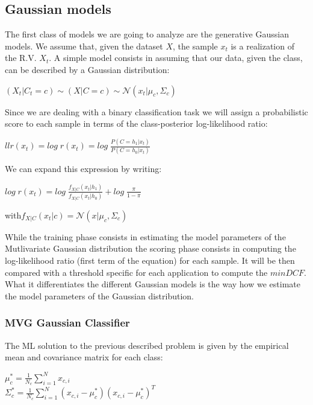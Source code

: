 \documentclass[10pt, a4paper, twocolumn]{article} %
\begin{document}
\subsection{Gaussian models}
The first class of models we are going to analyze are the generative Gaussian models. We assume that,
given the dataset $X$, the sample $x_{t}$ is a realization of the R.V. $X_{t}$. A simple
model consists in assuming that our data, given the class, can be described by a Gaussian distribution:
\begin{center}
	\begin{math}
		(X_{t}|C_{t}=c) \sim (X|C=c) \sim \mathcal{N} (x_{t}|\mu_{c},\Sigma_{c})
	\end{math}
\end{center}
Since we are dealing with a binary classification task 
we will assign a probabilistic score to each sample in terms of the class-posterior 
log-likelihood ratio:
\begin{center}
	\begin{math}
		llr(x_t)=log\;r(x_{t}) = log\;\frac{P(C = h_{1}|x_{t})}{P(C = h_{0}|x_{t})}
	\end{math}
\end{center}
We can expand this expression by writing:
\begin{center}
	$log\;r(x_{t}) = log\;\frac{f_{X|C}(x_{t}|h_{1})}{f_{X|C}(x_{t}|h_{0})} + log\;\frac{\pi}{1-\pi}$
\end{center}
\begin{center}
	with\;$ f_{X|C}(x_{t}|c) = \mathcal{N}(x|\mu_c,\Sigma_c)$
\end{center}
While the training phase consists in estimating the model parameters of the Mutlivariate Gaussian
distribution the scoring phase
consists in computing the log-likelihood ratio (first term of the equation) for each sample. 
It will be then compared with  a threshold specific for each application to compute
the $minDCF$. What it differentiates the different Gaussian models is the way how we estimate the
model parameters of the Gaussian distribution.

\subsubsection{MVG Gaussian Classifier}
The ML solution to the previous described problem is given by the empirical mean and covariance
matrix for each class:
\begin{center}
	$\mu_{c}^* = \frac{1}{N_c}\sum_{i=1}^{N}x_{c,i}$ \\
	$\Sigma_c^* = \frac{1}{N_c}\sum_{i=1}^{N}(x_{c,i}-\mu_c^*)(x_{c,i}-\mu_c^*)^T$
\end{center}
\end{document}
